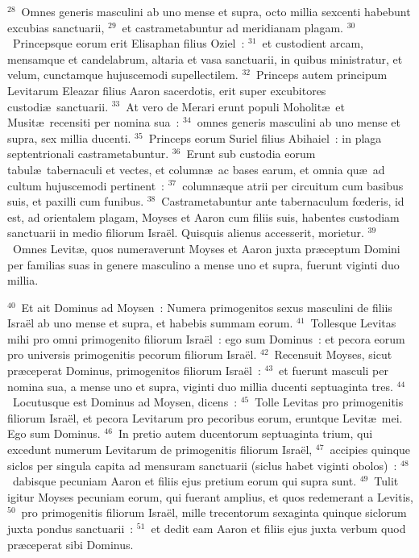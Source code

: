 ${}^{28}$~Omnes generis masculini ab uno mense et supra, octo millia sexcenti habebunt excubias sanctuarii,
${}^{29}$~et castrametabuntur ad meridianam plagam.
${}^{30}$~Princepsque eorum erit Elisaphan filius Oziel~:
${}^{31}$~et custodient arcam, mensamque et candelabrum, altaria et vasa sanctuarii, in quibus ministratur, et velum, cunctamque hujuscemodi supellectilem.
${}^{32}$~Princeps autem principum Levitarum Eleazar filius Aaron sacerdotis, erit super excubitores custodi\ae\ sanctuarii.
${}^{33}$~At vero de Merari erunt populi Moholit\ae\ et Musit\ae\ recensiti per nomina sua~:
${}^{34}$~omnes generis masculini ab uno mense et supra, sex millia ducenti.
${}^{35}$~Princeps eorum Suriel filius Abihaiel~: in plaga septentrionali castrametabuntur.
${}^{36}$~Erunt sub custodia eorum tabul\ae\ tabernaculi et vectes, et column\ae\ ac bases earum, et omnia qu\ae\ ad cultum hujuscemodi pertinent~:
${}^{37}$~column\ae que atrii per circuitum cum basibus suis, et paxilli cum funibus.
${}^{38}$~Castrametabuntur ante tabernaculum fœderis, id est, ad orientalem plagam, Moyses et Aaron cum filiis suis, habentes custodiam sanctuarii in medio filiorum Isra\"el. Quisquis alienus accesserit, morietur.
${}^{39}$~Omnes Levit\ae , quos numeraverunt Moyses et Aaron juxta pr\ae ceptum Domini per familias suas in genere masculino a mense uno et supra, fuerunt viginti duo millia.


${}^{40}$~Et ait Dominus ad Moysen~: Numera primogenitos sexus masculini de filiis Isra\"el ab uno mense et supra, et habebis summam eorum.
${}^{41}$~Tollesque Levitas mihi pro omni primogenito filiorum Isra\"el~: ego sum Dominus~: et pecora eorum pro universis primogenitis pecorum filiorum Isra\"el.
${}^{42}$~Recensuit Moyses, sicut pr\ae ceperat Dominus, primogenitos filiorum Isra\"el~:
${}^{43}$~et fuerunt masculi per nomina sua, a mense uno et supra, viginti duo millia ducenti septuaginta tres.
${}^{44}$~Locutusque est Dominus ad Moysen, dicens~:
${}^{45}$~Tolle Levitas pro primogenitis filiorum Isra\"el, et pecora Levitarum pro pecoribus eorum, eruntque Levit\ae\ mei. Ego sum Dominus.
${}^{46}$~In pretio autem ducentorum septuaginta trium, qui excedunt numerum Levitarum de primogenitis filiorum Isra\"el,
${}^{47}$~accipies quinque siclos per singula capita ad mensuram sanctuarii (siclus habet viginti obolos)~:
${}^{48}$~dabisque pecuniam Aaron et filiis ejus pretium eorum qui supra sunt.
${}^{49}$~Tulit igitur Moyses pecuniam eorum, qui fuerant amplius, et quos redemerant a Levitis,
${}^{50}$~pro primogenitis filiorum Isra\"el, mille trecentorum sexaginta quinque siclorum juxta pondus sanctuarii~:
${}^{51}$~et dedit eam Aaron et filiis ejus juxta verbum quod pr\ae ceperat sibi Dominus.

